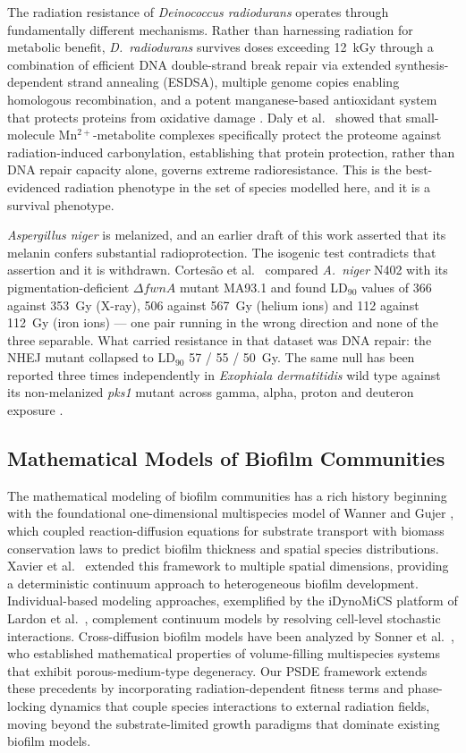 \documentclass[11pt]{article}
\begin{document}
The radiation resistance of \textit{Deinococcus radiodurans} operates through fundamentally
different mechanisms. Rather than harnessing radiation for metabolic benefit, \textit{D.\
radiodurans} survives doses exceeding 12~kGy through a combination of efficient DNA
double-strand break repair via extended synthesis-dependent strand annealing (ESDSA), multiple
genome copies enabling homologous recombination, and a potent manganese-based antioxidant system
that protects proteins from oxidative damage \cite{slade2011,daly2009}. Daly et al.\
\cite{daly2010} showed that small-molecule Mn$^{2+}$-metabolite complexes specifically protect
the proteome against radiation-induced carbonylation, establishing that protein protection, rather
than DNA repair capacity alone, governs extreme radioresistance. This is the best-evidenced
radiation phenotype in the set of species modelled here, and it is a survival phenotype.

\textit{Aspergillus niger} is melanized, and an earlier draft of this work asserted that its
melanin confers substantial radioprotection. The isogenic test contradicts that assertion and it
is withdrawn. Cortes\~{a}o et al.\ \cite{cortesao2020} compared \textit{A.\ niger} N402 with its
pigmentation-deficient $\Delta fwnA$ mutant MA93.1 and found LD$_{90}$ values of 366 against
353~Gy (X-ray), 506 against 567~Gy (helium ions) and 112 against 112~Gy (iron ions) --- one pair
running in the wrong direction and none of the three separable. What carried resistance in that
dataset was DNA repair: the NHEJ mutant collapsed to LD$_{90}$ 57 / 55 / 50~Gy. The same null has
been reported three times independently in \textit{Exophiala dermatitidis} wild type against its
non-melanized \textit{pks1} mutant across gamma, alpha, proton and deuteron exposure
\cite{audit2026}.

\subsection{Mathematical Models of Biofilm Communities}

The mathematical modeling of biofilm communities has a rich history beginning with the
foundational one-dimensional multispecies model of Wanner and Gujer \cite{wanner1986}, which
coupled reaction-diffusion equations for substrate transport with biomass conservation laws to
predict biofilm thickness and spatial species distributions. Xavier et al.\ \cite{xavier2005}
extended this framework to multiple spatial dimensions, providing a deterministic continuum
approach to heterogeneous biofilm development. Individual-based modeling approaches, exemplified
by the iDynoMiCS platform of Lardon et al.\ \cite{lardon2011}, complement continuum models by
resolving cell-level stochastic interactions. Cross-diffusion biofilm models have been analyzed
by Sonner et al.\ \cite{sonner2015}, who established mathematical properties of volume-filling
multispecies systems that exhibit porous-medium-type degeneracy. Our PSDE framework extends
these precedents by incorporating radiation-dependent fitness terms and phase-locking dynamics
that couple species interactions to external radiation fields, moving beyond the
substrate-limited growth paradigms that dominate existing biofilm models.
\end{document}
